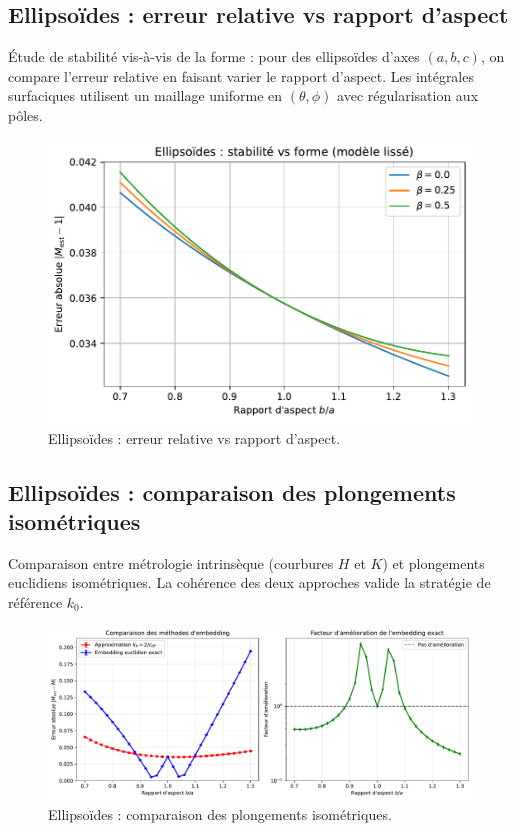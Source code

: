 \documentclass[11pt,a4paper]{article}
\begin{document}
\medskip

\subsection*{Ellipsoïdes : erreur relative vs rapport d’aspect}
Étude de stabilité vis-à-vis de la forme : pour des ellipsoïdes d’axes $(a,b,c)$, on compare l’erreur relative en faisant varier le rapport d’aspect. Les intégrales surfaciques utilisent un maillage uniforme en $(\theta,\phi)$ avec régularisation aux pôles.

\begin{figure}[htbp]
  \centering
  \includegraphics[width=\linewidth]{fig_relerr_vs_aspect_improved.pdf}
  \caption{Ellipsoïdes : erreur relative vs rapport d’aspect.}
  \label{fig:fig_relerr_vs_aspect_improved}
\end{figure}

\medskip

\subsection*{Ellipsoïdes : comparaison des plongements isométriques}
Comparaison entre métrologie intrinsèque (courbures $H$ et $K$) et plongements euclidiens isométriques. La cohérence des deux approches valide la stratégie de référence $k_0$.

\begin{figure}[htbp]
  \centering
  \includegraphics[width=\linewidth]{fig_ellipsoids_embedding_comparison.pdf}
  \caption{Ellipsoïdes : comparaison des plongements isométriques.}
  \label{fig:fig_ellipsoids_embedding_comparison}
\end{figure}
\end{document}
